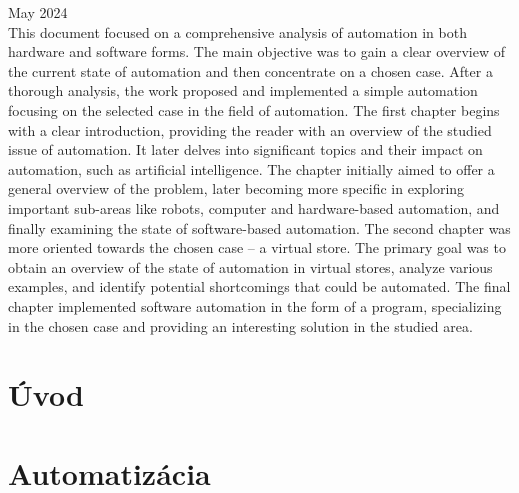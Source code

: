 \documentclass[twoside,slovak, a4paper]{article}
\newcommand\blankpage{
    \null
    \thispagestyle{empty}
    \addtocounter{page}{1}
    \newpage}
\newcommand\blankpag{%
    \clearpage
    \vspace*{\fill}
   
}
\begin{document}
\noindent
May 2024\\[2em]

\noindent
This document focused on a comprehensive analysis of automation in both hardware and software forms. The main objective was to gain a clear overview of the current state of automation and then concentrate on a chosen case. After a thorough analysis, the work proposed and implemented a simple automation focusing on the selected case in the field of automation. The first chapter begins with a clear introduction, providing the reader with an overview of the studied issue of automation. It later delves into significant topics and their impact on automation, such as artificial intelligence. The chapter initially aimed to offer a general overview of the problem, later becoming more specific in exploring important sub-areas like robots, computer and hardware-based automation, and finally examining the state of software-based automation. The second chapter was more oriented towards the chosen case – a virtual store. The primary goal was to obtain an overview of the state of automation in virtual stores, analyze various examples, and identify potential shortcomings that could be automated. The final chapter implemented software automation in the form of a program, specializing in the chosen case and providing an interesting solution in the studied area.

\blankpage

\blankpage

\tableofcontents

\setcounter{page}{11}
\blankpag
\blankpage
{}
\setcounter{page}{1}
\section{Úvod}

\blankpag\blankpage

\section{Automatizácia}
\end{document}
